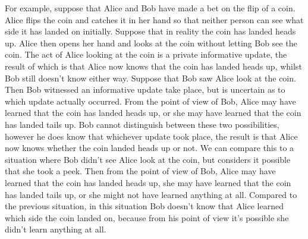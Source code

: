 For example, suppose that Alice and Bob have made a bet on the flip of a coin.
Alice flips the coin and catches it in her hand so that neither person can see
what side it has landed on initially. Suppose that in reality the coin has
landed heads up. Alice then opens her hand and looks at the coin without letting
Bob see the coin. The act of Alice looking at the coin is a private informative
update, the result of which is that Alice now knows that the coin has landed
heads up, whilst Bob still doesn't know either way. Suppose that Bob saw Alice
look at the coin. Then Bob witnessed an informative update take place, but is
uncertain as to which update actually occurred. From the point of view of Bob,
Alice may have learned that the coin has landed heads up, or she may have
learned that the coin has landed tails up. Bob cannot distinguish between these
two possibilities, however he does know that whichever update took place, the
result is that Alice now knows whether the coin landed heads up or not. We can
compare this to a situation where Bob didn't see Alice look at the coin, but
considers it possible that she took a peek. Then from the point of view of Bob,
Alice may have learned that the coin has landed heads up, she may have learned
that the coin has landed tails up, or she might not have learned anything at
all. Compared to the previous situation, in this situation Bob doesn't know that
Alice learned which side the coin landed on, because from his point of view it's
possible she didn't learn anything at all.

